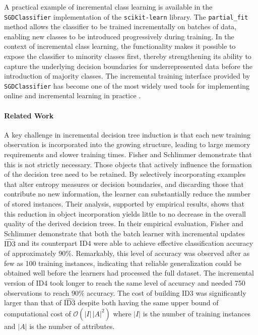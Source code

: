 \documentclass[conference]{IEEEtran}
\begin{document}
A practical example of incremental class learning is available in the \texttt{SGDClassifier} implementation of the \texttt{scikit-learn} library. 
The \texttt{partial\_fit} method allows the classifier to be trained incrementally on batches of data, enabling new classes to be introduced progressively during training. 
In the context of incremental class learning, the functionality makes it possible to expose the classifier to minority classes first, thereby strengthening its ability to capture 
the underlying decision boundaries for underrepresented data before the introduction of majority classes. The incremental training interface provided by \texttt{SGDClassifier} has become one of the most widely used 
tools for implementing online and incremental learning in practice \cite{pedregosa2011scikit}.

\paragraph{Related Work}
A key challenge in incremental decision tree induction is that each new training observation is incorporated into the growing structure, leading to
 large memory requirements and slower training times. Fisher and Schlimmer \cite{fisher1986} demonstrate that this is not strictly necessary. Those 
 objects that actively influence the formation of the decision tree need to be retained. By selectively incorporating examples that alter entropy measures or 
 decision boundaries, and discarding those that contribute no new information, the learner can substantially reduce the number of stored instances. Their 
 analysis, supported by empirical results, shows that this reduction in object incorporation yields little to no decrease in the overall quality of 
 the derived decision trees. In their empirical evaluation, Fisher and Schlimmer demonstrate that both the batch learner with incremental 
 updates \(\widehat{\mathrm{ID3}}\) and its counterpart ID4 were able to achieve effective classification accuracy of approximately 90\%. Remarkably, 
 this level of accuracy was observed after as few as 100 training instances, 
 indicating that reliable generalization could be obtained well before the learners had processed the full dataset. The incremental version of
 ID4 took longer to reach the same level of accuracy and needed 750 observations to reach 90\% accuracy. The cost of building 
 ID3 was significantly larger than that of \(\widehat{\mathrm{ID3}}\) despite both having the same upper bound of computational cost of 
  $\mathcal{O}(|I|\,|A|^2)$ where \(|I|\) is the number of training instances and \(|A|\) is the number of attributes.\\
\end{document}
